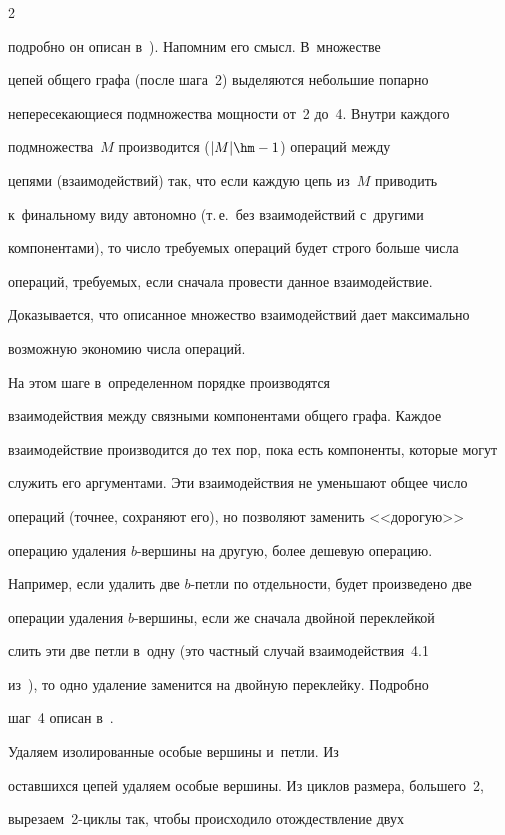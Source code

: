 \begin{multicols}{2}
\begin{description}
подробно он описан в~\cite[п.~4]{1-gor}). Напомним его смысл. В~множестве 


цепей общего графа (после шага~2) выделяются небольшие попарно 


непересекающиеся подмножества мощ\-ности от~2 до~4. Внутри каждого 


подмножества~$M$ производится ($\vert M\vert \hm-1$) операций между 


цепями (взаимодействий) так, что если каждую цепь из~$M$ приводить 


к~финальному виду автономно (т.\,е.\ без взаимодействий с~другими 


компонентами), то число требуемых операций будет строго больше числа 


операций, тре\-бу\-емых, если сначала провести данное взаимодействие. 


Доказывается, что описанное множество взаимодействий дает максимально 


возможную экономию числа операций.


  \item[Шаг~4.] На этом шаге в~определенном порядке производятся 


взаимодействия между связными компонентами общего графа. Каждое 


взаимодействие производится до тех пор, пока есть компоненты, которые могут 


служить его аргументами. Эти взаимодействия не уменьшают общее число 


операций (точнее, сохраняют его), но позволяют заменить <<дорогую>> 


операцию удаления $b$-вер\-ши\-ны на другую, более дешевую операцию. 


Например, если удалить две $b$-пет\-ли по отдельности, будет произведено две 


операции удаления $b$-вер\-ши\-ны, если же сначала двойной переклейкой 


слить эти две петли в~одну (это частный случай взаимодействия~4.1  


из~\cite{1-gor}), то одно удаление заменится на двойную переклейку. Подробно 


шаг~4 описан в~\cite[п.~4]{1-gor}.


  \item[Шаг~5.] Удаляем изолированные особые вершины и~петли. Из 


оставшихся цепей удаляем особые вершины. Из циклов размера, большего~2, 


вырезаем~2-цик\-лы так, чтобы происходило отож\-де\-ст\-вле\-ние двух  



\end{description}
\end{multicols}
